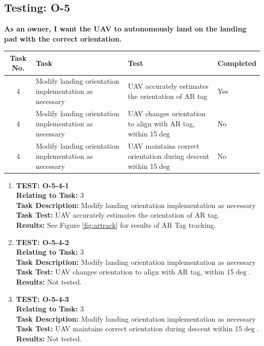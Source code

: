 \newpage
\subsection{Testing: O-5}
\textbf{As an owner, I want the UAV to autonomously land on the landing pad with the correct orientation.}\\
\begin{tabular}{| c | >{\raggedright}m{4cm} | m{4cm} | m{4cm} |}\hline
	Task No. & Task & Test & Completed\\\hline
		4 & Modify landing orientation implementation as necessary & UAV accurately estimates the orientation of AR tag & Yes\\ \hline
		4 & Modify landing orientation implementation as necessary & UAV changes orientation to align with AR tag, within 15$\deg$ & No\\ \hline
		4 & Modify landing orientation implementation as necessary & UAV maintains correct orientation during descent within 15$\deg$ & No\\ \hline
\end{tabular}

\begin{enumerate}
\item \textbf{TEST: O-5-4-1}\\
\textbf{Relating to Task:} 3\\
\textbf{Task Description:} Modify landing orientation implementation as necessary\\
\textbf{Task Test:} UAV accurately estimates the orientation of AR tag.\\
\textbf{Results:} See Figure \ref{fig:artrack} for results of AR Tag tracking.

\item \textbf{TEST: O-5-4-2}\\
\textbf{Relating to Task:} 3\\
\textbf{Task Description:} Modify landing orientation implementation as necessary\\
\textbf{Task Test:} UAV changes orientation to align with AR tag, within 15$\deg$.\\
\textbf{Results:} Not tested.

\item \textbf{TEST: O-5-4-3}\\
\textbf{Relating to Task:} 3\\
\textbf{Task Description:} Modify landing orientation implementation as necessary\\
\textbf{Task Test:} UAV maintains correct orientation during descent within 15$\deg$.\\
\textbf{Results:}  Not tested.
\end{enumerate}
